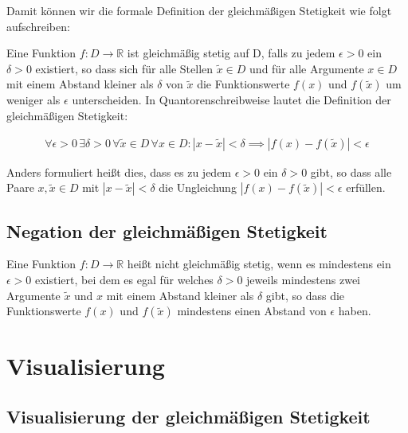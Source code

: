 \documentclass[fontsize=9pt,
               parskip=half-,
               DIV=14,
               listof=chapterentry,
               tocflat]{scrbook}
\begin{document}
Damit können wir die formale Definition der gleichmäßigen Stetigkeit wie folgt aufschreiben:

\begin{definition*}
Eine Funktion $f:D\to \mathbb {R} $ ist gleichmäßig stetig auf D, falls zu jedem $\epsilon >0$ ein $\delta >0$ existiert, so dass sich für alle Stellen ${\tilde {x}}\in D$ und für alle Argumente $x\in D$ mit einem Abstand kleiner als $\delta $ von ${\tilde {x}}$ die Funktionswerte $f(x)$ und $f({\tilde {x}})$ um weniger als $\epsilon $ unterscheiden. In Quantorenschreibweise lautet die Definition der gleichmäßigen Stetigkeit:

\begin{align*}
\forall \epsilon >0\,\exists \delta >0\,\forall {\tilde {x}}\in D\,\forall x\in D:|x-{\tilde {x}}|<\delta \implies |f(x)-f({\tilde {x}})|<\epsilon 
\end{align*}

\end{definition*}

Anders formuliert heißt dies, dass es zu jedem $\epsilon >0$ ein $\delta >0$ gibt, so dass alle Paare $x,{\tilde {x}}\in D$ mit $|x-{\tilde {x}}|<\delta $ die Ungleichung $|f(x)-f({\tilde {x}})|<\epsilon $ erfüllen.

\clearpage

\subsection{Negation der gleichmäßigen Stetigkeit}

\begin{definition*}
Eine Funktion $f:D\to \mathbb {R} $ heißt nicht gleichmäßig stetig, wenn es mindestens ein $\epsilon >0$ existiert, bei dem es egal für welches $\delta >0$ jeweils mindestens zwei Argumente ${\tilde {x}}$ und $x$ mit einem Abstand kleiner als $\delta $ gibt, so dass die Funktionswerte $f(x)$ und $f({\tilde {x}})$ mindestens einen Abstand von $\epsilon $ haben.

\end{definition*}

\section{Visualisierung}

\subsection{Visualisierung der gleichmäßigen Stetigkeit}
\end{document}
